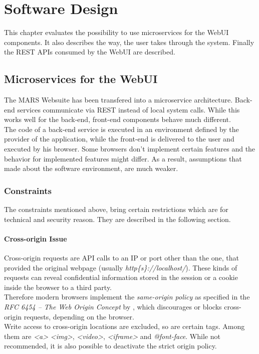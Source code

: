 
\chapter{Software Design}
This chapter evaluates the possibility to use microservices for the WebUI components. It also describes the way, the user takes through the system. Finally the REST APIs consumed by the WebUI are described.



\section{Microservices for the WebUI}
\label{sec:MS_for_WebUI}
The MARS Websuite has been transfered into a microservice architecture. Back-end services communicate via REST instead of local system calls. While this works well for the back-end, front-end components behave much different.\\
The code of a back-end service is executed in an environment defined by the provider of the application, while the front-end is delivered to the user and executed by his browser. Some browsers don't implement certain features and the behavior for implemented features might differ. As a result, assumptions that made about the software environment, are much weaker. 


\subsection{Constraints}
The constraints mentioned above, bring certain restrictions which are for technical and security reason. They are described in the following section.

\subsubsection{Cross-origin Issue}
Cross-origin requests are API calls to an IP or port other than the one, that provided the original webpage (usually \textit{http\{s\}://localhost/}). These kinds of requests can reveal confidential information stored in the session or a cookie inside the browser to a third party.\\
Therefore modern browsers implement the \textit{same-origin policy} as specified in the \textit{RFC 6454 -- The Web Origin Concept} by \cite{barth2011web}, which discourages or blocks cross-origin requests, depending on the browser.\\
Write access to cross-origin locations are excluded, so are certain tags. Among them are \textit{<a>} \textit{<img>}, \textit{<video>}, \textit{<iframe>} and \textit{@font-face}. While not recommended, it is also possible to deactivate the strict origin policy.

